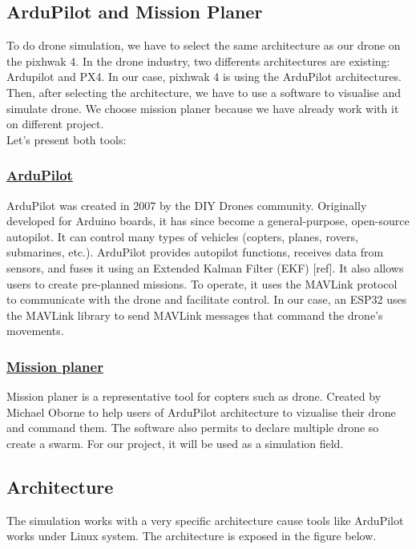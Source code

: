 \subsection{ArduPilot and Mission Planer}

To do drone simulation, we have to select the same architecture as our drone on the pixhwak 4. In the drone industry, two differents architectures are existing: Ardupilot and PX4. In our case, pixhwak 4 is using the ArduPilot architectures. \\
Then, after selecting the architecture, we have to use a software to visualise and simulate drone. We choose mission planer because we have already work with it on different project. \\
Let's present both tools:

\subsubsection{\href{https://github.com/ArduPilot/ardupilot}{ArduPilot}}

 ArduPilot was created in 2007 by the DIY Drones community. Originally developed for Arduino boards, it has since become a general-purpose, open-source autopilot. It can control many types of vehicles (copters, planes, rovers, submarines, etc.). ArduPilot provides autopilot functions, receives data from sensors, and fuses it using an Extended Kalman Filter (EKF) [ref]. It also allows users to create pre-planned missions. To operate, it uses the MAVLink protocol to communicate with the drone and facilitate control. In our case, an ESP32 uses the MAVLink library to send MAVLink messages that command the drone’s movements.

\subsubsection{\href{https://ardupilot.org/planner/}{Mission planer}}

Mission planer is a representative tool for copters such as drone. Created by  Michael Oborne to help users of ArduPilot architecture to vizualise their drone and command them. The software also permits to declare  multiple drone so create a swarm. For our project, it will be used as a simulation field. 
\newpage
\subsection{Architecture}

The simulation works with a very specific architecture cause tools like ArduPilot works under Linux system. The architecture is exposed in the figure below. 


